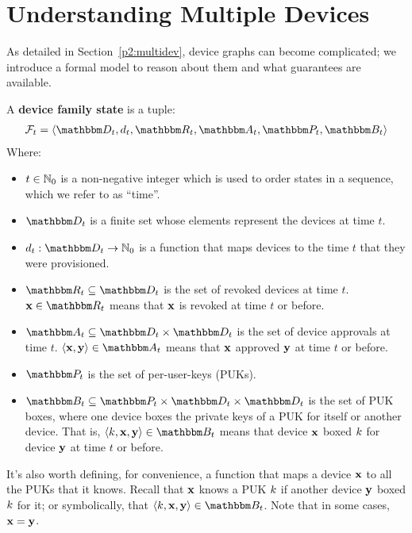 \section{Understanding Multiple Devices}
\label{appendix:multidev}

As detailed in Section~\ref{p2:multidev}, device graphs can become complicated; we introduce a formal 
model to reason about them and what guarantees are available.

\begin{definition}
A \textbf{device family state} is a tuple: 
\begin{gather*}
\zfam_t = \langle \zset{d}_t, \zdevtime_t, \zset{r}_t, \zset{a}_t, \zset{p}_t, \zset{b}_t \rangle
\end{gather*}
Where:
\begin{itemize}
\item $t \in \mathbb{N}_0$ is a non-negative integer which is used to order states in a sequence, which we refer to as ``time''.
\item $\zset{d}_t$ is a finite set whose elements represent the devices at time $t$.
\item $\zdevtime_t : \zset{d}_t \rightarrow \integers_0$ is a function that maps devices to
the time $t$ that they were provisioned.
\item $\zset{r}_t \subseteq \zset{d}_t$ is the set of revoked devices at time $t$. $\zdev{x} \in \zset{r}_t$ means that $\mathbf{x}$ is revoked at time $t$ or before.
\item $\zset{a}_t \subseteq \zset{d}_t \times \zset{d}_t$ is the set of device approvals at
time $t$. $\langle \zdev{x}, \zdev{y} \rangle \in \zset{a}_t$ means that $\mathbf{x}$ approved
$\mathbf{y}$ at time $t$ or before.
\item $\zset{p}_t$ is the set of per-user-keys (PUKs).
\item $\zset{b}_t \subseteq \zset{p}_t \times \zset{d}_t \times \zset{d}_t$ is the set of PUK
boxes, where one device boxes the private keys of a PUK for itself or another device.
That is, $\langle \zkey{k}, \zdev{x}, \zdev{y} \rangle \in \zset{b}_t$ means that 
device $\mathbf{x}$ boxed ${k}$ for device $\mathbf{y}$ at time $t$ or before.
\end{itemize}
\end{definition}

It’s also worth defining, for convenience, a function that maps a device $\mathbf{x}$
to all the PUKs that it knows. Recall that $\mathbf{x}$ knows a PUK ${k}$
if another device $\mathbf{y}$ boxed ${k}$ for it; or symbolically,
that $\langle \zkey{k}, \zdev{x}, \zdev{y} \rangle \in \zset{b}_t$.
Note that in some cases, $\mathbf{x} = \mathbf{y}$. 

